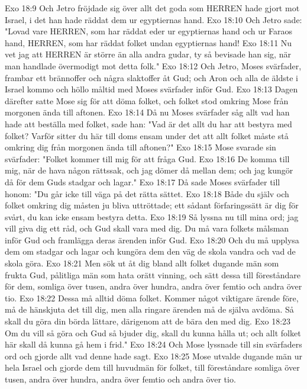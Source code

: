 Exo 18:9  Och Jetro fröjdade sig över allt det goda som HERREN hade gjort mot Israel, i det han hade räddat dem ur egyptiernas hand.
Exo 18:10  Och Jetro sade: "Lovad vare HERREN, som har räddat eder ur egyptiernas hand och ur Faraos hand, HERREN, som har räddat folket undan egyptiernas hand!
Exo 18:11  Nu vet jag att HERREN är större än alla andra gudar, ty så bevisade han sig, när man handlade övermodigt mot detta folk."
Exo 18:12  Och Jetro, Moses svärfader, frambar ett brännoffer och några slaktoffer åt Gud; och Aron och alla de äldste i Israel kommo och höllo måltid med Moses svärfader inför Gud.
Exo 18:13  Dagen därefter satte Mose sig för att döma folket, och folket stod omkring Mose från morgonen ända till aftonen.
Exo 18:14  Då nu Moses svärfader såg allt vad han hade att beställa med folket, sade han: "Vad är det allt du har att bestyra med folket? Varför sitter du här till doms ensam under det att allt folket måste stå omkring dig från morgonen ända till aftonen?"
Exo 18:15  Mose svarade sin svärfader: "Folket kommer till mig för att fråga Gud.
Exo 18:16  De komma till mig, när de hava någon rättssak, och jag dömer då mellan dem; och jag kungör då för dem Guds stadgar och lagar."
Exo 18:17  Då sade Moses svärfader till honom: "Du går icke till väga på det rätta sättet.
Exo 18:18  Både du själv och folket omkring dig måsten ju bliva uttröttade; ett sådant förfaringssätt är dig för svårt, du kan icke ensam bestyra detta.
Exo 18:19  Så lyssna nu till mina ord; jag vill giva dig ett råd, och Gud skall vara med dig. Du må vara folkets målsman inför Gud och framlägga deras ärenden inför Gud.
Exo 18:20  Och du må upplysa dem om stadgar och lagar och kungöra dem den väg de skola vandra och vad de skola göra.
Exo 18:21  Men sök ut åt dig bland allt folket dugande män som frukta Gud, pålitliga män som hata orätt vinning, och sätt dessa till föreståndare för dem, somliga över tusen, andra över hundra, andra över femtio och andra över tio.
Exo 18:22  Dessa må alltid döma folket. Kommer något viktigare ärende före, må de hänskjuta det till dig, men alla ringare ärenden må de själva avdöma. Så skall du göra din börda lättare, därigenom att de bära den med dig.
Exo 18:23  Om du vill så göra och Gud så bjuder dig, skall du kunna hålla ut; och allt folket här skall då kunna gå hem i frid."
Exo 18:24  Och Mose lyssnade till sin svärfaders ord och gjorde allt vad denne hade sagt.
Exo 18:25  Mose utvalde dugande män ur hela Israel och gjorde dem till huvudmän för folket, till föreståndare somliga över tusen, andra över hundra, andra över femtio och andra över tio.
